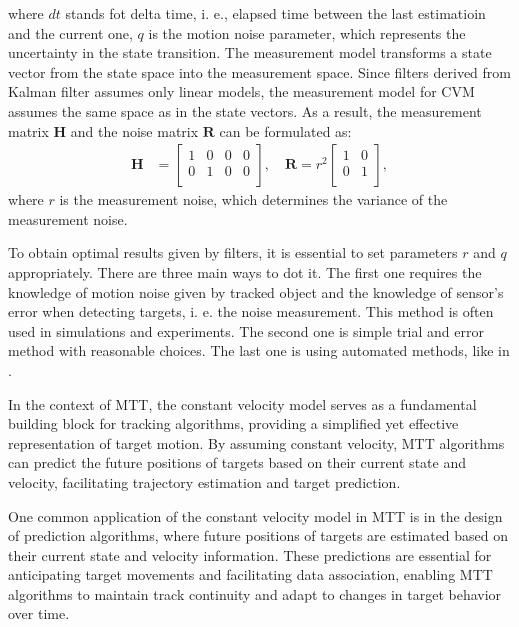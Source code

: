 where $dt$ stands fot delta time, i. e., elapsed time between the last estimatioin and the current one, $q$ is the
motion noise parameter, which represents the uncertainty in the state transition. The measurement model transforms a
state vector from the state space into the measurement space. Since filters derived from Kalman filter assumes only
linear models, the measurement model for CVM assumes the same space as in the state vectors. As a result, the
measurement matrix $\mathbf{H}$ and the noise matrix $\mathbf{R}$ can be formulated as:
\begin{align}
    \mathbf{H} &=
    \begin{bmatrix}
        1 & 0 & 0 & 0 \\
        0 & 1 & 0 & 0 \\
    \end{bmatrix},
    \quad \mathbf{R} = r^2
    \begin{bmatrix}
        1 & 0  \\
        0 & 1  \\
    \end{bmatrix},
\end{align}
where $r$ is the measurement noise, which determines the variance of the measurement noise.

To obtain optimal results given by filters, it is essential to set parameters $r$ and $q$ appropriately. There are
three main ways to dot it. The first one requires the knowledge of motion noise given by tracked object and the
knowledge of sensor's error when detecting targets, i. e. the noise measurement. This method is often used in
simulations and experiments. The second one is simple trial
and error method with reasonable choices. The last one is using automated methods, like in \cite{BulutEastimation2011}.

In the context of MTT, the constant velocity model serves as a fundamental building block for tracking algorithms, providing a simplified yet effective representation of target motion. By assuming constant velocity, MTT algorithms can predict the future positions of targets based on their current state and velocity, facilitating trajectory estimation and target prediction.

One common application of the constant velocity model in MTT is in the design of prediction algorithms, where future positions of targets are estimated based on their current state and velocity information. These predictions are essential for anticipating target movements and facilitating data association, enabling MTT algorithms to maintain track continuity and adapt to changes in target behavior over time.

